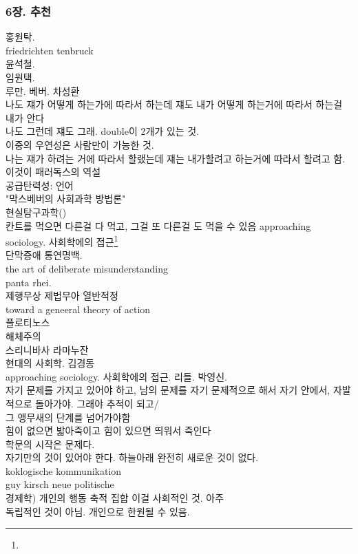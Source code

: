 \documentclass[11pt, a4paper]{article}
\begin{document}
\subsubsection{6장. 추천}

홍원탁. \\
friedrichten tenbruck\\
윤석철.\\
임원택.\\
루만. 베버. 차성환\\
나도 쟤가 어떻게 하는가에 따라서 하는데 쟤도 내가 어떻게 하는거에 따라서 하는걸 내가 안다\\
나도 그런데 쟤도 그래. double이 2개가 있는 것.\\
이중의 우연성은 사람만이 가능한 것. \\
나는 쟤가 하려는 거에 따라서 할랬는데 쟤는 내가할려고 하는거에 따라서 할려고 함. 이것이 패러독스의 역설\\
공급탄력성: 언어\\
"막스베버의 사회과학 방법론"\\
현실탐구과학()\\
칸트를 먹으면 다른걸 다 먹고, 그걸 또 다른걸 도 먹을 수 있음
approaching sociology. 사회학에의 접근\footnote{}\\
단막증애 통연명백.\\
the art of deliberate misunderstanding\\
panta rhei.\\
제행무상 제법무아 열반적정\\
toward a geneeral theory of action\\
플로티노스\\
해체주의\\
스리니바사 라마누잔\\
현대의 사회학. 김경동\\
approaching sociology. 사회학에의 접근. 리들. 박영신.\\
자기 문제를 가지고 있어야 하고, 남의 문제를 자기 문제적으로 해서 자기 안에서, 자발적으로 돌아가야. 그래야 추적이 되고/\\ 그 앵무새의 단계를 넘어가야함\\
힘이 없으면 밟아죽이고 힘이 있으면 띄워서 죽인다\\
학문의 시작은 문제다. \\
자기만의 것이 있어야 한다. 하늘아래 완전히 새로운 것이 없다.\\ koklogische kommunikation\\
guy kirsch neue politische \\
경제학) 개인의 행동 축적 집합 이걸 사회적인 것. 아주\\ 독립적인 것이 아님. 개인으로 한원될 수 있음.\\
\end{document}
